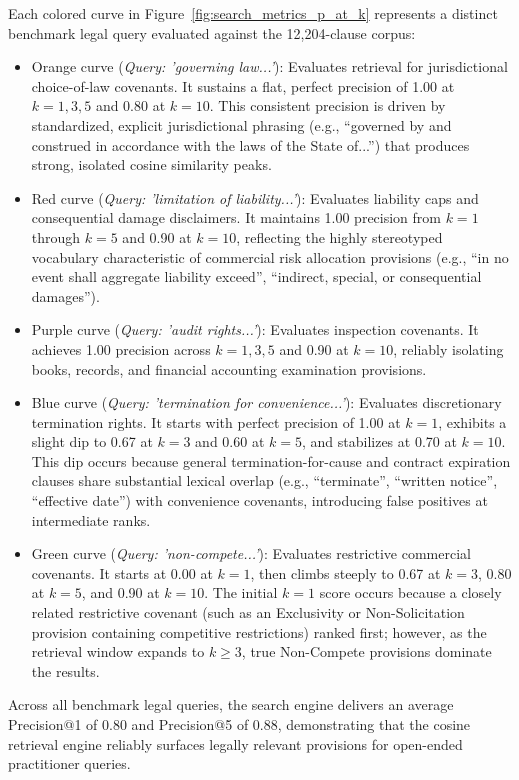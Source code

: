 Each colored curve in Figure~\ref{fig:search_metrics_p_at_k} represents a distinct benchmark legal query evaluated against the 12,204-clause corpus:
\begin{itemize}
    \item Orange curve (\textit{Query: 'governing law...'}): Evaluates retrieval for jurisdictional choice-of-law covenants. It sustains a flat, perfect precision of 1.00 at $k=1, 3, 5$ and 0.80 at $k=10$. This consistent precision is driven by standardized, explicit jurisdictional phrasing (e.g., ``governed by and construed in accordance with the laws of the State of...'') that produces strong, isolated cosine similarity peaks.
    \item Red curve (\textit{Query: 'limitation of liability...'}): Evaluates liability caps and consequential damage disclaimers. It maintains 1.00 precision from $k=1$ through $k=5$ and 0.90 at $k=10$, reflecting the highly stereotyped vocabulary characteristic of commercial risk allocation provisions (e.g., ``in no event shall aggregate liability exceed'', ``indirect, special, or consequential damages'').
    \item Purple curve (\textit{Query: 'audit rights...'}): Evaluates inspection covenants. It achieves 1.00 precision across $k=1, 3, 5$ and 0.90 at $k=10$, reliably isolating books, records, and financial accounting examination provisions.
    \item Blue curve (\textit{Query: 'termination for convenience...'}): Evaluates discretionary termination rights. It starts with perfect precision of 1.00 at $k=1$, exhibits a slight dip to 0.67 at $k=3$ and 0.60 at $k=5$, and stabilizes at 0.70 at $k=10$. This dip occurs because general termination-for-cause and contract expiration clauses share substantial lexical overlap (e.g., ``terminate'', ``written notice'', ``effective date'') with convenience covenants, introducing false positives at intermediate ranks.
    \item Green curve (\textit{Query: 'non-compete...'}): Evaluates restrictive commercial covenants. It starts at 0.00 at $k=1$, then climbs steeply to 0.67 at $k=3$, 0.80 at $k=5$, and 0.90 at $k=10$. The initial $k=1$ score occurs because a closely related restrictive covenant (such as an Exclusivity or Non-Solicitation provision containing competitive restrictions) ranked first; however, as the retrieval window expands to $k \ge 3$, true Non-Compete provisions dominate the results.
\end{itemize}

Across all benchmark legal queries, the search engine delivers an average Precision@1 of 0.80 and Precision@5 of 0.88, demonstrating that the cosine retrieval engine reliably surfaces legally relevant provisions for open-ended practitioner queries.
